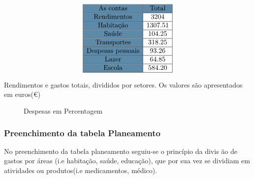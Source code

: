 \documentclass[11pt]{beamer}
\begin{document}
\begin{frame}
\begin{table}
$$\begin{array}{|>{\columncolor{airforceblue}}c|c|} \hline
\rowcolor{airforceblue} \text{As contas} & \text{Total} \\ \hline
\text{Rendimentos} & 3204 \\ \hline
\text{Habitação} & 1307.51 \\ \hline
\text{Saúde} & 104.25 \\ \hline
\text{Transportes} & 318.25 \\ \hline
\text{Despesas pessoais} & 93.26 \\ \hline
\text{Lazer} & 64.85 \\ \hline
\text{Escola} & 584.20 \\ \hline
\end{array}$$
\caption{Rendimentos e gastos totais, divididos por setores. Os valores são apresentados em euros(\euro)}
\end{table}
\end{frame}

\begin{frame}
\begin{figure} []
\caption{Despesas em Percentagem}
\end{figure}
\end{frame}

\begin{frame}
\frametitle{Preenchimento da tabela Planeamento}
No preenchimento da tabela planeamento seguiu-se o princípio da divis
ão de gastos por áreas (i.e habitação, saúde, educação), que por sua vez se dividiam em atividades ou produtos(i.e medicamentos, médico).

\end{frame}
\end{document}
